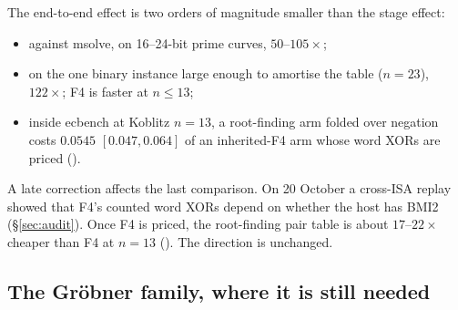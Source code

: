 The end-to-end effect is two orders of magnitude smaller than the stage
effect:
\begin{itemize}
\item against msolve, on 16--24-bit prime curves, $50$--$105\times$;
\item on the one binary instance large enough to amortise the table
  ($n=23$), $122\times$; F4 is faster at $n\le13$;
\item inside ecbench at Koblitz $n=13$, a root-finding arm folded over
  negation costs $0.0545$ $[0.047,0.064]$ of an inherited-F4 arm whose
  word XORs are priced ().
\end{itemize}
A late correction affects the last comparison. On 20 October a cross-ISA
replay showed that F4's counted word XORs depend on whether the host has
BMI2 (\S\ref{sec:audit}). Once F4 is priced, the root-finding pair table
is about $17$--$22\times$ cheaper than F4 at $n=13$
(). The
direction is unchanged.

\subsection{The Gr\"obner family, where it is still needed}

